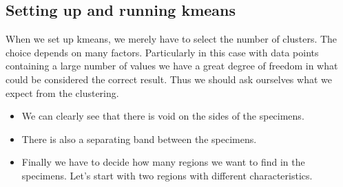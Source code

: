 \documentclass[letterpaper,10pt,english]{sphinxmanual}
\begin{document}
\subsection{Setting up and running k\sphinxhyphen{}means}
\label{\detokenize{ML4NeutronImageSegmentation:setting-up-and-running-k-means}}
When we set up k\sphinxhyphen{}means, we merely have to select the number of clusters. The choice depends on many factors. Particularly in this case with data points containing a large number of values we have a great degree of freedom in what could be considered the correct result. Thus we should ask ourselves what we expect from the clustering.
\begin{itemize}
\item {} 
We can clearly see that there is void on the sides of the specimens.

\item {} 
There is also a separating band between the specimens.

\item {} 
Finally we have to decide how many regions we want to find in the specimens. Let’s start with two regions with different characteristics.

\end{itemize}

\begin{sphinxVerbatim}[commandchars=\\\{\}]
   
   \PYG{p}{[}\PYG{p}{]} 
               
\end{sphinxVerbatim}

\end{document}
